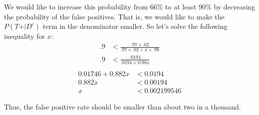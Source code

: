 \documentclass[12pt]{article}
\begin{document}
 We would like to increase this probability from 66\% to at least 90\% by decreasing the probability of the false positives. That is, we would like to make the $P(T\text{+} | D^c)$ term in the denominator smaller. So let's solve the following inequality for $x$:
 \begin{align*}
 .9 &< \frac{.97 \times .02}{.97 \times .02 + x\times .98}\\
 .9 &< \frac{.0194} { .0194 +  0.98x}\\
\end{align*}
 \begin{align*} 
 0.01746 + 0.882 x &<  0.0194 \\
0.882 x &< 0.00194 \\
x &< 0.002199546
\end{align*}

Thus, the false positive rate should be smaller than about two in a thousand.
\end{document}
